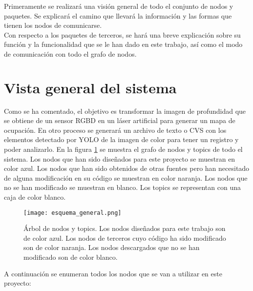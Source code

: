 Primeramente se realizará una visión general de todo el conjunto de nodos y paquetes. Se explicará el camino que llevará la información y las formas que tienen los nodos de comunicarse.\\

Con respecto a los paquetes de terceros, se hará una breve explicación sobre su función y la funcionalidad que se le han dado en este trabajo, así como el modo de comunicación con todo el grafo de nodos.\\

\section{Vista general del sistema}

Como se ha comentado, el objetivo es transformar la imagen de profundidad que se obtiene de un sensor RGBD en un láser artificial para generar un mapa de ocupación. En otro proceso se generará un archivo de texto o CVS con los elementos detectado por YOLO de la imagen de color para tener un registro y poder analizarlo. En la figura \ref{fig:esq_general} se muestra el grafo de nodos y topics de todo el sistema. Los nodos que han sido diseñados para este proyecto se muestran en color azul. Los nodos que han sido obtenidos de otras fuentes pero han necesitado de alguna modificación en su código se muestran en color naranja. Los nodos que no se han modificado se muestran en blanco. Los topics se representan con una caja de color blanco.\\

\begin{figure}[h]
	\begin{center} 
		\texttt{[image: esquema\_general.png]}
	\end{center}
	\caption{Árbol de nodos y topics. Los nodos diseñados para este trabajo son de color azul. Los nodos de terceros cuyo código ha sido modificado son de color naranja. Los nodos descargados que no se han modificado son de color blanco.}
	\label{fig:esq_general}
\end{figure}

A continuación se enumeran todos los nodos que se van a utilizar en este proyecto:

